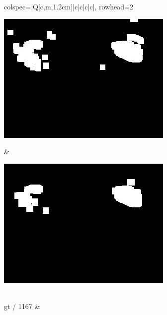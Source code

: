 \begin{longtblr}[
            caption = {Hasil uji coba proses \textit{background subtraction} menggunakan GMM yang disempurnakan oleh Operasi Morfologi},
            label = {tab:gmm_morph_9908}
        ]{
            colspec={|Q[c,m,1.2cm]|c|c|c|c|},
            rowhead=2
        }
\begin{minipage}{0.19\textwidth}
                \includegraphics[width=\linewidth]{image/gt_116/gt_116_dilated_5x11_frame859.jpg}
            \end{minipage} & 
            \begin{minipage}{0.19\textwidth}
                \includegraphics[width=\linewidth]{image/gt_116/gt_116_dilated_7x13_frame859.jpg}
            \end{minipage} \\
            \hline
            gt / 1167 &
            \begin{minipage}{0.19\textwidth}

\end{minipage}
\end{longtblr}
